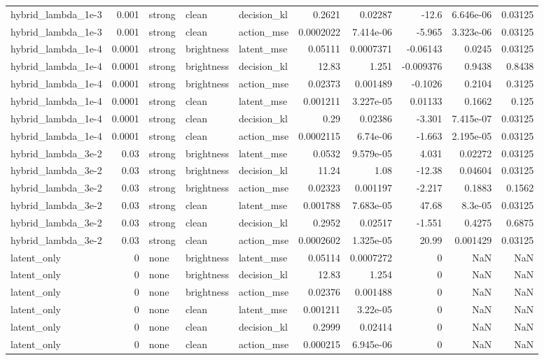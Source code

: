 \begin{tabular}{lrlllrrrrr}
hybrid\_lambda\_1e-3 & 0.001 & strong & clean & decision\_kl & 0.2621 & 0.02287 & -12.6 & 6.646e-06 & 0.03125 \\
hybrid\_lambda\_1e-3 & 0.001 & strong & clean & action\_mse & 0.0002022 & 7.414e-06 & -5.965 & 3.323e-06 & 0.03125 \\
hybrid\_lambda\_1e-4 & 0.0001 & strong & brightness & latent\_mse & 0.05111 & 0.0007371 & -0.06143 & 0.0245 & 0.03125 \\
hybrid\_lambda\_1e-4 & 0.0001 & strong & brightness & decision\_kl & 12.83 & 1.251 & -0.009376 & 0.9438 & 0.8438 \\
hybrid\_lambda\_1e-4 & 0.0001 & strong & brightness & action\_mse & 0.02373 & 0.001489 & -0.1026 & 0.2104 & 0.3125 \\
hybrid\_lambda\_1e-4 & 0.0001 & strong & clean & latent\_mse & 0.001211 & 3.227e-05 & 0.01133 & 0.1662 & 0.125 \\
hybrid\_lambda\_1e-4 & 0.0001 & strong & clean & decision\_kl & 0.29 & 0.02386 & -3.301 & 7.415e-07 & 0.03125 \\
hybrid\_lambda\_1e-4 & 0.0001 & strong & clean & action\_mse & 0.0002115 & 6.74e-06 & -1.663 & 2.195e-05 & 0.03125 \\
hybrid\_lambda\_3e-2 & 0.03 & strong & brightness & latent\_mse & 0.0532 & 9.579e-05 & 4.031 & 0.02272 & 0.03125 \\
hybrid\_lambda\_3e-2 & 0.03 & strong & brightness & decision\_kl & 11.24 & 1.08 & -12.38 & 0.04604 & 0.03125 \\
hybrid\_lambda\_3e-2 & 0.03 & strong & brightness & action\_mse & 0.02323 & 0.001197 & -2.217 & 0.1883 & 0.1562 \\
hybrid\_lambda\_3e-2 & 0.03 & strong & clean & latent\_mse & 0.001788 & 7.683e-05 & 47.68 & 8.3e-05 & 0.03125 \\
hybrid\_lambda\_3e-2 & 0.03 & strong & clean & decision\_kl & 0.2952 & 0.02517 & -1.551 & 0.4275 & 0.6875 \\
hybrid\_lambda\_3e-2 & 0.03 & strong & clean & action\_mse & 0.0002602 & 1.325e-05 & 20.99 & 0.001429 & 0.03125 \\
latent\_only & 0 & none & brightness & latent\_mse & 0.05114 & 0.0007272 & 0 & NaN & NaN \\
latent\_only & 0 & none & brightness & decision\_kl & 12.83 & 1.254 & 0 & NaN & NaN \\
latent\_only & 0 & none & brightness & action\_mse & 0.02376 & 0.001488 & 0 & NaN & NaN \\
latent\_only & 0 & none & clean & latent\_mse & 0.001211 & 3.22e-05 & 0 & NaN & NaN \\
latent\_only & 0 & none & clean & decision\_kl & 0.2999 & 0.02414 & 0 & NaN & NaN \\
latent\_only & 0 & none & clean & action\_mse & 0.000215 & 6.945e-06 & 0 & NaN & NaN \\
\bottomrule
\end{tabular}
